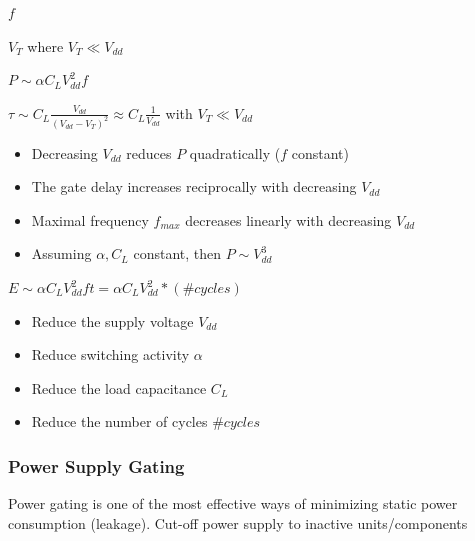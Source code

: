\begin{definition} 
$f$
\end{definition}

\begin{definition} 
$V_T$ where $V_T \ll V_{dd}$
\end{definition}

\begin{theorem} 
${ P \sim \alpha C_L V^2_{dd} f }$
\end{theorem}

\begin{theorem} 
${ \tau \sim C_L \frac{V_{dd}}{(V_{dd} - V_T)^2} \approx C_L \frac{1}{V_{dd}}}$ with $V_T \ll V_{dd}$
\end{theorem}


\begin{itemize}[noitemsep]
\item Decreasing $V_{dd}$ reduces $P$ quadratically ($f$ constant)
\item The gate delay increases reciprocally with decreasing $V_{dd}$
\item Maximal frequency $f_{max}$ decreases linearly with decreasing $V_{dd}$
\item Assuming $\alpha, C_L$ constant, then $P \sim V_{dd}^3$
\end{itemize}

\begin{theorem}[Energy]
$E \sim \alpha C_L V^2_{dd} f t = \alpha C_L V^2_{dd} * (\#cycles) $
\end{theorem}

\begin{itemize}[noitemsep]
\item Reduce the supply voltage $V_{dd}$
\item Reduce switching activity $\alpha$
\item Reduce the load capacitance $C_L$
\item Reduce the number of cycles $\#cycles$
\end{itemize}


\subsubsection{Power Supply Gating}
Power gating is one of the most effective ways of minimizing static power consumption (leakage). Cut-off power supply to inactive units/components


